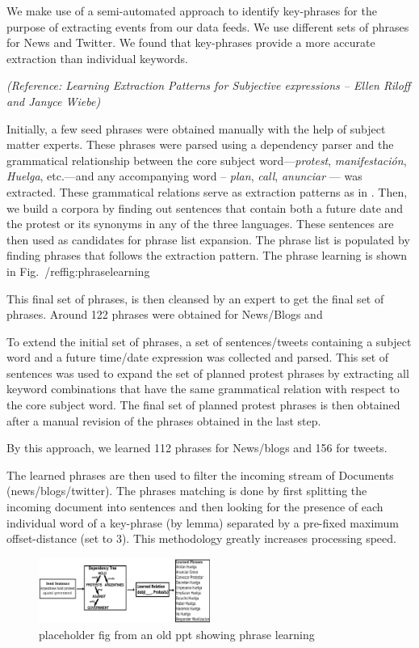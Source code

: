 We make use of a semi-automated approach to identify key-phrases for the purpose of extracting events from our data feeds. We use different sets of phrases for News and Twitter. We found that key-phrases provide a more accurate extraction than individual keywords.



{\em (Reference: Learning Extraction Patterns for Subjective expressions -- Ellen Riloff and Janyce Wiebe)}

Initially, a few seed phrases were obtained manually
with the help of subject matter experts. These phrases were parsed
using a dependency parser and the grammatical relationship between the
core subject word---{\em protest}, {\em manifestación}, {\em Huelga},
etc.---and any accompanying word -- {\em plan}, {\em call}, {\em anunciar} --- was extracted. These grammatical relations serve as extraction patterns as in \cite{riloff}. Then, we build a corpora by finding out sentences that contain both a future date and the protest or its synonyms in any of the three languages. These sentences are then used as candidates for phrase list expansion. The phrase list is populated by finding phrases that follows the extraction pattern.
The phrase learning is shown in Fig.~/ref{fig:phraselearning}

This final set of phrases, is then cleansed by an expert to get the final set of phrases. Around 122 phrases were obtained for News/Blogs and 

To extend the initial set of phrases, a set of sentences/tweets containing a subject word and a
future time/date expression was collected and parsed.  This set of
sentences was used to expand the set of planned protest phrases by
extracting all keyword combinations that have the same grammatical
relation with respect to the core subject word. The final set of
planned protest phrases is then obtained after a manual revision of
the phrases obtained in the last step.

By this approach, we learned 112 phrases for News/blogs and 156 for tweets.

The learned phrases are then used to filter the incoming stream of Documents (news/blogs/twitter). The phrases matching is done by first splitting the incoming document into sentences and then looking for the presence of each individual word of a key-phrase (by lemma) separated by a pre-fixed maximum offset-distance (set to 3). This methodology greatly increases processing speed.

\begin{figure}
\caption{placeholder fig from an old ppt showing phrase learning}
\includegraphics[width=0.5\textwidth]{figures/phraseLearning}
\end{figure}
